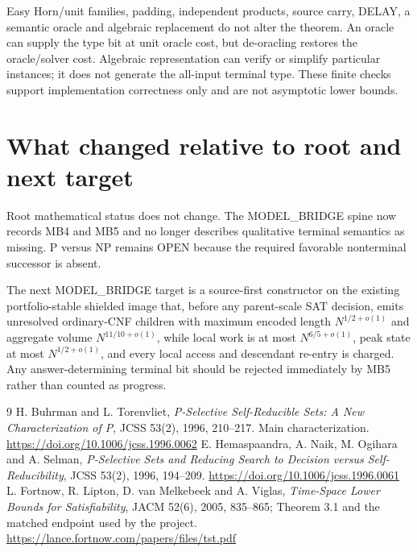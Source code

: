 \documentclass[11pt]{article}
\begin{document}
Easy Horn/unit families, padding, independent products, source carry,
DELAY, a semantic oracle and algebraic replacement do not alter the theorem.
An oracle can supply the type bit at unit oracle cost, but de-oracling restores
the oracle/solver cost.  Algebraic representation can verify or simplify
particular instances; it does not generate the all-input terminal type.
These finite checks support implementation correctness only and are not
asymptotic lower bounds.

\section{What changed relative to root and next target}
Root mathematical status does not change.  The MODEL\_BRIDGE spine now
records MB4 and MB5 and no longer describes qualitative terminal semantics
as missing.  P versus NP remains OPEN because the required favorable
nonterminal successor is absent.

The next MODEL\_BRIDGE target is a source-first constructor on the existing
portfolio-stable shielded image that, before any parent-scale SAT decision,
emits unresolved ordinary-CNF children with maximum encoded length
$N^{1/2+o(1)}$ and aggregate volume $N^{11/10+o(1)}$, while local work is at
most $N^{6/5+o(1)}$, peak state at most $N^{1/2+o(1)}$, and every local
access and descendant re-entry is charged.  Any answer-determining terminal
bit should be rejected immediately by MB5 rather than counted as progress.

\begin{thebibliography}{9}
 H. Buhrman and L. Torenvliet,
\emph{P-Selective Self-Reducible Sets: A New Characterization of P},
JCSS 53(2), 1996, 210--217.  Main characterization.
\url{https://doi.org/10.1006/jcss.1996.0062}
 E. Hemaspaandra, A. Naik, M. Ogihara and
A. Selman, \emph{P-Selective Sets and Reducing Search to Decision versus
Self-Reducibility}, JCSS 53(2), 1996, 194--209.
\url{https://doi.org/10.1006/jcss.1996.0061}
 L. Fortnow, R. Lipton, D. van Melkebeek and A. Viglas,
\emph{Time-Space Lower Bounds for Satisfiability}, JACM 52(6), 2005,
835--865; Theorem 3.1 and the matched endpoint used by the project.
\url{https://lance.fortnow.com/papers/files/tst.pdf}
\end{thebibliography}

\end{document}
